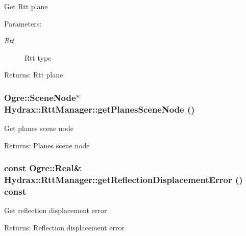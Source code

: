 \begin{CompactItemize}
Get Rtt plane \begin{Desc}
\item[Parameters:]
\begin{description}
\item[{\em Rtt}]Rtt type \end{description}
\end{Desc}
\begin{Desc}
\item[Returns:]Rtt plane \end{Desc}
\hypertarget{class_hydrax_1_1_rtt_manager_2c97d4371d854526fb5ffdc37a40a595}{
\subsubsection[{getPlanesSceneNode}]{\setlength{\rightskip}{0pt plus 5cm}Ogre::SceneNode$\ast$ Hydrax::RttManager::getPlanesSceneNode ()}}
\label{class_hydrax_1_1_rtt_manager_2c97d4371d854526fb5ffdc37a40a595}


Get planes scene node \begin{Desc}
\item[Returns:]Planes scene node \end{Desc}
\hypertarget{class_hydrax_1_1_rtt_manager_021cdc044e7f215158dc3747419db037}{
\subsubsection[{getReflectionDisplacementError}]{\setlength{\rightskip}{0pt plus 5cm}const Ogre::Real\& Hydrax::RttManager::getReflectionDisplacementError () const}}
\label{class_hydrax_1_1_rtt_manager_021cdc044e7f215158dc3747419db037}


Get reflection displacement error \begin{Desc}
\item[Returns:]Reflection displacement error \end{Desc}
\hypertarget{class_hydrax_1_1_rtt_manager_dc5af0a29c8e491e8ea9fba6349e208c}{
}
\end{CompactItemize}
